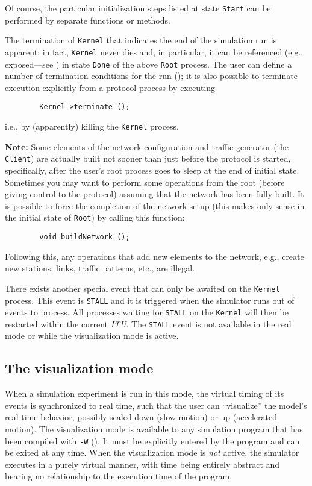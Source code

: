 Of course, the particular initialization steps listed at state {\tt Start}
can be performed by separate functions or methods.

The termination of {\tt Kernel} that indicates the end of the simulation
run is apparent: in fact, {\tt Kernel} never dies and, in particular, it
can be referenced (e.g., exposed---see )
in state {\tt Done} of the above {\tt Root} process.
The user can define a number of termination conditions for the
run ();
it is also possible to terminate execution explicitly
from a protocol process by executing
\begin{verbatim}
        Kernel->terminate ();
\end{verbatim}
i.e., by (apparently) killing the {\tt Kernel} process.

\medskip

\noindent
{\bf Note:}
Some elements of the network configuration and traffic generator
(the {\tt Client}) are actually built not sooner than
just before the protocol is started, specifically,
after the user's root process goes to sleep at the end of initial state.
Sometimes you may want to perform some operations from the root (before
giving control to the protocol) assuming that the network has been fully built.
It is possible to force the completion of the
network setup (this makes only sense in the initial state of {\tt Root})
by calling this function:
\begin{verbatim}
        void buildNetwork ();
\end{verbatim}
Following this, any operations that
add new elements to the network, e.g., create new stations, links, traffic
patterns, etc., are illegal.

\medskip

There exists another special event that can only be awaited on the
{\tt Kernel} process.
This event is {\tt STALL} and it is triggered when the simulator runs out
of events to process.
All processes waiting for {\tt STALL} on the {\tt Kernel} will then be
restarted within the current {\em ITU}.
The {\tt STALL} event is not available in the real mode or while the
visualization mode is active.

\subsection{The visualization mode}
\label{rm_pr_vi}

When a simulation experiment is run in this mode, the virtual timing of its
events is synchronized to real time, such that the user can ``visualize'' the
model's real-time behavior, possibly scaled down (slow motion) or up
(accelerated motion).
The visualization mode is available to any simulation program that
has been compiled with {\tt -W} ().
It must be explicitly entered by the program and can be exited at any time.
When the visualization mode is {\em not\/} active, the simulator executes in
a purely virtual manner, with time being entirely abstract and bearing no
relationship to the execution time of the program.

